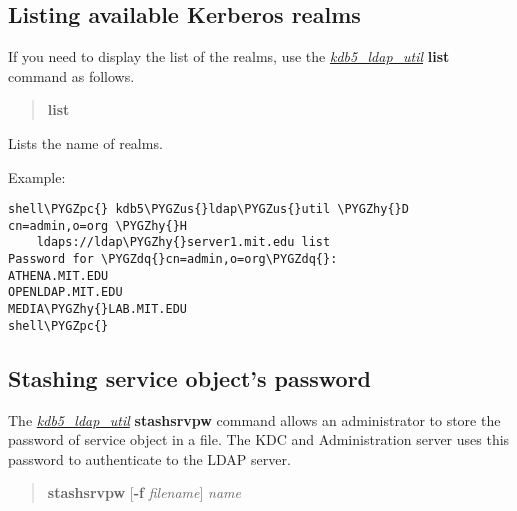 \documentclass[letterpaper,10pt,english]{sphinxmanual}
\def\PYGZus{\char`\_}
\def\PYGZpc{\char`\%}
\def\PYGZhy{\char`\-}
\def\PYGZdq{\char`\"}
\begin{document}
\subsection{Listing available Kerberos realms}
\label{admin/database:listing-available-kerberos-realms}
If you need to display the list of the realms, use the
{\hyperref[admin/admin_commands/kdb5_ldap_util:kdb5-ldap-util-8]{\emph{kdb5\_ldap\_util}}} \textbf{list} command as follows.
\begin{quote}

\textbf{list}
\end{quote}

Lists the name of realms.

Example:

\begin{Verbatim}[commandchars=\\\{\}]
shell\PYGZpc{} kdb5\PYGZus{}ldap\PYGZus{}util \PYGZhy{}D cn=admin,o=org \PYGZhy{}H
    ldaps://ldap\PYGZhy{}server1.mit.edu list
Password for \PYGZdq{}cn=admin,o=org\PYGZdq{}:
ATHENA.MIT.EDU
OPENLDAP.MIT.EDU
MEDIA\PYGZhy{}LAB.MIT.EDU
shell\PYGZpc{}
\end{Verbatim}


\subsection{Stashing service object's password}
\label{admin/database:stashing-service-object-s-password}\label{admin/database:stash-ldap}
The {\hyperref[admin/admin_commands/kdb5_ldap_util:kdb5-ldap-util-8]{\emph{kdb5\_ldap\_util}}} \textbf{stashsrvpw} command allows an
administrator to store the password of service object in a file.  The
KDC and Administration server uses this password to authenticate to
the LDAP server.
\begin{quote}

\textbf{stashsrvpw}
{[}\textbf{-f} \emph{filename}{]}
\emph{name}
\end{quote}
\end{document}
